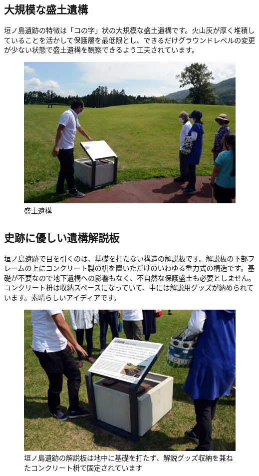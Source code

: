 \documentclass[a4j,11pt,twocolumn,openany]{jsbook}
\begin{document}
\subsection{大規模な盛土遺構}

垣ノ島遺跡の特徴は「コの字」状の大規模な盛土遺構です。火山灰が厚く堆積していることを活かして保護層を最低限とし、できるだけグラウンドレベルの変更が少ない状態で盛土遺構を観察できるよう工夫されています。

\begin{figure}[ht]
	\centering
	\includegraphics[width=\linewidth]{fig/01_Iseki_kengaku/16Kakinosima_morido.JPG}
	\caption{盛土遺構}
	\label{}
\end{figure}

\subsection{史跡に優しい遺構解説板}
垣ノ島遺跡で目を引くのは、基礎を打たない構造の解説板です。解説板の下部フレームの上にコンクリート製の枡を置いただけのいわゆる重力式の構造です。基礎が不要なので地下遺構への影響もなく、不自然な保護盛土も必要としません。コンクリート枡は収納スペースになっていて、中には解説用グッズが納められています。素晴らしいアイディアです。

\begin{figure}[ht]
	\centering
	\includegraphics[width=\linewidth]{fig/01_Iseki_kengaku/17_Kakinosima_sign.JPG}
	\caption{
		垣ノ島遺跡の解説板は地中に基礎を打たず、解説グッズ収納を兼ねたコンクリート枡で固定されています}
	\label{}
\end{figure}
\end{document}
